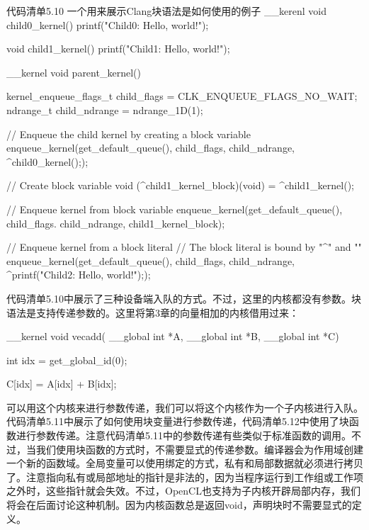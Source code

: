 \begin{codeboxt}[cpp]{代码清单5.10 一个用来展示Clang块语法是如何使用的例子}
__kerenl
void child0_kernel(){
  printf("Child0: Hello, world!\n");
}

void child1_kernel(){
  printf("Child1: Hello, world!\n");
}

__kernel
void parent_kernel(){
  kernel_enqueue_flags_t child_flags = CLK_ENQUEUE_FLAGS_NO_WAIT;
  ndrange_t child_ndrange = ndrange_1D(1);

  // Enqueue the child kernel by creating a block variable
  enqueue_kernel(get_default_queue(), child_flags, child_ndrange, ^{child0_kernel();});

  // Create block variable
  void (^child1_kernel_block)(void) = ^{child1_kernel()};

  // Enqueue kernel from block variable
  enqueue_kernel(get_default_queue(), child_flags. child_ndrange, child1_kernel_block);

  // Enqueue kernel from a block literal
  // The block literal is bound by "^{" and "}"
  enqueue_kernel(get_default_queue(), child_flags, child_ndrange, ^{printf("Child2: Hello, world!\n");});
}
\end{codeboxt}

代码清单5.10中展示了三种设备端入队的方式。不过，这里的内核都没有参数。块语法是支持传递参数的。这里将第3章的向量相加的内核借用过来：

\begin{codebox}[cpp]
__kernel
void vecadd(
  __global int *A,
  __global int *B,
  __global int *C){

  int idx = get_global_id(0);

  C[idx] = A[idx] + B[idx];
}
\end{codebox}

可以用这个内核来进行参数传递，我们可以将这个内核作为一个子内核进行入队。代码清单5.11中展示了如何使用块变量进行参数传递，代码清单5.12中使用了块函数进行参数传递。注意代码清单5.11中的参数传递有些类似于标准函数的调用。不过，当我们使用块函数的方式时，不需要显式的传递参数。编译器会为作用域创建一个新的函数域。全局变量可以使用绑定的方式，私有和局部数据就必须进行拷贝了。注意指向私有或局部地址的指针是非法的，因为当程序运行到工作组或工作项之外时，这些指针就会失效。不过，OpenCL也支持为子内核开辟局部内存，我们将会在后面讨论这种机制。因为内核函数总是返回void，声明块时不需要显式的定义。

